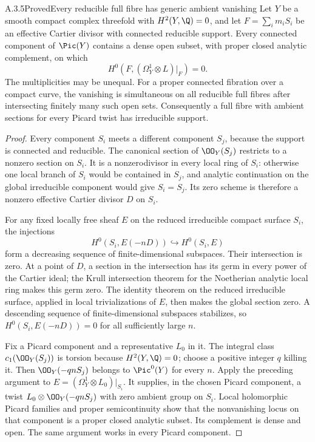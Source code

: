\begin{statement}{A.3.5}{Proved}{Every reducible full fibre has generic ambient vanishing}
Let $Y$ be a smooth compact complex threefold with $H^2(Y,\Q)=0$, and let $F=\sum_i m_iS_i$ be an effective Cartier divisor with connected reducible support. Every connected component of $\Pic(Y)$ contains a dense open subset, with proper closed analytic complement, on which
\[
 H^0(F,(\Omega_Y^1\otimes L)|_F)=0.
 \tag{A.15b}
\]
The multiplicities may be unequal. For a proper connected fibration over a compact curve, the vanishing is simultaneous on all reducible full fibres after intersecting finitely many such open sets. Consequently a full fibre with ambient sections for every Picard twist has irreducible support.
\end{statement}
\begin{proof}
Every component $S_i$ meets a different component $S_j$, because the support is connected and reducible. The canonical section of $\OO_Y(S_j)$ restricts to a nonzero section on $S_i$. It is a nonzerodivisor in every local ring of $S_i$: otherwise one local branch of $S_i$ would be contained in $S_j$, and analytic continuation on the global irreducible component would give $S_i=S_j$. Its zero scheme is therefore a nonzero effective Cartier divisor $D$ on $S_i$.

For any fixed locally free sheaf $E$ on the reduced irreducible compact surface $S_i$, the injections
\[
 H^0(S_i,E(-nD))\hookrightarrow H^0(S_i,E)
\]
form a decreasing sequence of finite-dimensional subspaces. Their intersection is zero. At a point of $D$, a section in the intersection has its germ in every power of the Cartier ideal; the Krull intersection theorem for the Noetherian analytic local ring makes this germ zero. The identity theorem on the reduced irreducible surface, applied in local trivializations of $E$, then makes the global section zero. A descending sequence of finite-dimensional subspaces stabilizes, so $H^0(S_i,E(-nD))=0$ for all sufficiently large $n$.

Fix a Picard component and a representative $L_0$ in it. The integral class $c_1(\OO_Y(S_j))$ is torsion because $H^2(Y,\Q)=0$; choose a positive integer $q$ killing it. Then $\OO_Y(-qnS_j)$ belongs to $\Pic^0(Y)$ for every $n$. Apply the preceding argument to $E=(\Omega_Y^1\otimes L_0)|_{S_i}$. It supplies, in the chosen Picard component, a twist $L_0\otimes\OO_Y(-qnS_j)$ with zero ambient group on $S_i$. Local holomorphic Picard families and proper semicontinuity show that the nonvanishing locus on that component is a proper closed analytic subset. Its complement is dense and open. The same argument works in every Picard component.


\end{proof}
